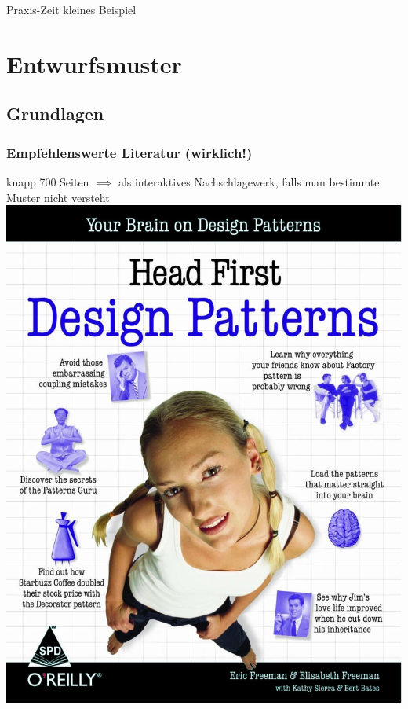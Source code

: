 \documentclass[18pt]{beamer}
\begin{document}
\begin{frame}{Praxis-Zeit}
	\huge \centering kleines Beispiel
\end{frame}

\section{Entwurfsmuster}
	\subsection{Grundlagen}
	\begin{frame}
		\frametitle{Empfehlenswerte Literatur (wirklich!)}
		knapp 700 Seiten \linebreak $\implies$ als interaktives Nachschlagewerk, falls man bestimmte Muster nicht versteht \linebreak
		\centering
		\includegraphics[scale=0.15]{./pics/tut3/literature.jpg}
	\end{frame}
		
\end{document}
